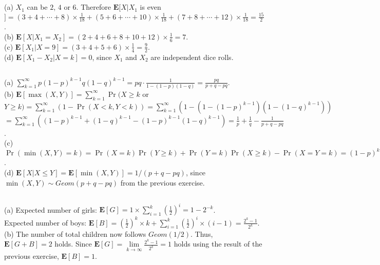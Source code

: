 \documentclass{article}
\begin{document}
\subsection{}
(a) $X_1$ can be $2$, $4$ or $6$. Therefore $\textbf{E}[X|X_1$ is even$] = (3+4+\cdots+8)\times \frac{1}{18}+(5+6+\cdots+10)\times \frac{1}{18}+(7+8+\cdots+12)\times \frac{1}{18}=\frac{15}{2}$.\\
(b) $\textbf{E}[X|X_1 = X_2]=(2+4+6+8+10+12)\times\frac{1}{6}=7$.\\
(c) $\textbf{E}[X_1|X=9]=(3+4+5+6)\times\frac{1}{4}=\frac{9}{2}$.\\
(d) $\textbf{E}[X_1 - X_2|X=k]=0$, since $X_1$ and $X_2$ are independent dice rolls.
\subsection{}
(a) $\sum\limits_{k=1}^\infty p(1-p)^{k-1}q(1-q)^{k-1}=pq\cdot\frac{1}{1-(1-p)(1-q)}=\frac{pq}{p+q-pq}$.\\
(b) $\textbf{E}[\max (X,Y)]=\sum\limits_{k=1}^\infty \Pr(X\geq k$ or $Y \geq k)=\sum\limits_{k=1}^\infty(1-\Pr(X<k,Y<k))=\sum\limits_{k=1}^\infty(1-(1-(1-p)^{k-1})(1-(1-q)^{k-1}))$\\
$=\sum\limits_{k=1}^\infty((1-p)^{k-1}+(1-q)^{k-1}-(1-p)^{k-1}(1-q)^{k-1})=\frac{1}{p}+\frac{1}{q}-\frac{1}{p+q-pq}$.\\
(c) $\Pr(\min(X,Y)=k)=\Pr(X=k)\Pr(Y\geq k)+\Pr(Y=k)\Pr(X\geq k)-\Pr(X=Y=k)=(1-p)^{k-1}(1-q)^{k-1}(p+q-pq)=(1-(p+q-pq))^{k-1}(p+q-pq)$.\\
(d) $\textbf{E}[X|X\leq Y]=\textbf{E}[\min(X,Y)]=1/(p+q-pq)$, since $\min(X,Y)\sim Geom(p+q-pq)$ from the previous exercise.
\subsection{}
(a) Expected number of girls: $\textbf{E}[G]=1\times\sum\limits_{i=1}^k(\frac{1}{2})^i=1-2^{-k}$.\\
Expected number of boys: $\textbf{E}[B]=(\frac{1}{2})^k\times k+\sum\limits_{i=1}^k(\frac{1}{2})^i\times(i-1)=\frac{2^k-1}{2^k}$.\\
(b) The number of total children now follows $Geom(1/2)$. Thus, $\textbf{E}[G+B]=2$ holds. Since $\textbf{E}[G]=\lim\limits_{k\rightarrow \infty}\frac{2^k-1}{2^k}=1$ holds using the result of the previous exercise, $\textbf{E}[B]=1$.
\end{document}
